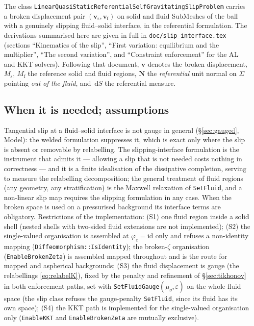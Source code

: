 \documentclass[11pt]{article}
\numberwithin{equation}{section}
\theoremstyle{remark}
\newcommand{\eps}{\varepsilon}
\newcommand{\dS}{\,\mathrm{d}S}
\newcommand{\vv}{\mathbf{v}}
\newcommand{\vN}{\mathbf{N}}
\newcommand{\code}[1]{\texttt{#1}}
\begin{document}
The class \code{LinearQuasiStaticReferentialSelfGravitatingSlipProblem}
carries a broken displacement pair $(\vv_{\mathrm{s}},\vv_{\mathrm{f}})$
on solid and fluid SubMeshes of the ball with a genuinely slipping
fluid--solid interface, in the referential formulation. The derivations
summarised here are given in full in \code{doc/slip\_interface.tex}
(sections ``Kinematics of the slip'', ``First variation: equilibrium and
the multiplier'', ``The second variation'', and ``Constraint enforcement''
for the AL and KKT solvers). Following that document, $\vv$ denotes the
broken displacement, $M_{\mathrm{s}}$, $M_{\mathrm{f}}$ the reference solid
and fluid regions, $\vN$ the \emph{referential} unit normal on $\Sigma$
pointing \emph{out of the fluid}, and $\dS$ the referential measure.

\subsection{When it is needed; assumptions}

Tangential slip at a fluid--solid interface is not gauge in general
(\S\ref{sec:gauged}, Model): the welded formulation suppresses it, which
is exact only where the slip is absent or removable by relabelling. The
slipping-interface formulation is the instrument that admits it --- allowing
a slip that is not needed costs nothing in correctness --- and it is a
finite idealisation of the dissipative completion, serving to measure the
relabelling decomposition; the general treatment of fluid regions
(any geometry, any stratification) is the Maxwell relaxation of
\code{SetFluid}, and a non-linear slip map requires the slipping
formulation in any case. When the broken space is used on a pressurised
background its interface terms are obligatory. Restrictions of the
implementation: (S1) one fluid region inside a solid shell (nested shells
with two-sided fluid extensions are not implemented); (S2) the
single-valued organisation is assembled at $\varphi_e = \mathrm{id}$ only
and refuses a non-identity mapping (\code{Diffeomorphism::IsIdentity}); the
broken-$\zeta$ organisation (\code{EnableBrokenZeta}) is assembled mapped
throughout and is the route for mapped and aspherical backgrounds; (S3)
the fluid displacement is gauge (the relabellings \eqref{eq:relabelK}),
fixed by the penalty and refinement of \S\ref{sec:tikhonov} in both
enforcement paths, set with \code{SetFluidGauge}$(\mu_g,\eps)$ on the whole
fluid space (the slip class refuses the gauge-penalty \code{SetFluid}, since its fluid
has its own space); (S4) the KKT path is implemented for the single-valued
organisation only (\code{EnableKKT} and \code{EnableBrokenZeta} are
mutually exclusive).
\end{document}
